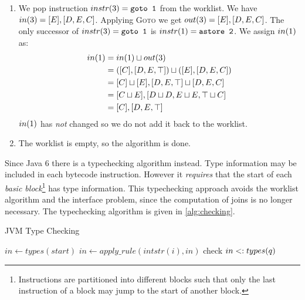 \documentclass{article}
\begin{document}
\begin{example}
\begin{enumerate}
  \item We pop instruction $instr{}(3) = \texttt{goto 1}$ from the worklist.
    We have $in(3) = [E], [D,E,C]$.
    Applying \textsc{Goto} we get $out(3) = [E], [D,E,C]$.
    The only successor of $instr{}(3) = \texttt{goto 1}$ is $instr{}(1) = \texttt{astore 2}$.
    We assign $in(1)$ as:
    \begin{align*}
      in(1) &= in(1) \sqcup out(3) \\
               &= ([C], [D, E, \top]) \sqcup ([E], [D,E,C]) \\
               &= [C] \sqcup [E], [D, E, \top] \sqcup [D,E,C] \\
               &= [C \sqcup E], [D \sqcup D, E \sqcup E, \top \sqcup C] \\
               &= [C], [D,E,\top]
    \end{align*}
    $in(1)$ has \textit{not} changed so we do not add it back to the worklist.
  \item The worklist is empty, so the algorithm is done.
  \end{enumerate}
\end{example}

Since Java 6 there is a typechecking algorithm instead.
Type information may be included in each bytecode instruction.
However it \textit{requires} that the start of each
\textit{basic block}\footnote{Instructions are partitioned into different blocks such that only the last instruction of a block may jump to the start of another block.}
has type information.
This typechecking approach avoids the worklist algorithm and the interface problem, since the computation of joins is no longer necessary.
The typechecking algorithm is given in \ref{alg:checking}.

\begin{algorithm}
\caption{JVM Type Checking}\label{alg:checking}
\begin{algorithmic}
    \State $in \gets types(start)$ 
      \State $in \gets apply\_rule(intstr{}(i), in)$ 
          \State check $in <: types(q)$ 
        \EndIf
      \EndFor
    \EndFor
  \EndFor
\end{algorithmic}
\end{algorithm}
\end{document}
